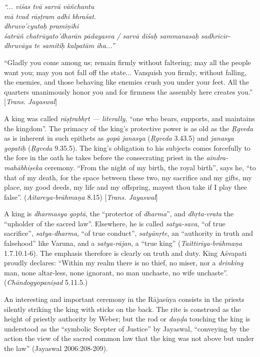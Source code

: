 \begin{myquote}
{{\sl “... viśas tvā sarvā vāñchantu}}\\
{{\sl mā tvad rāṣṭram adhi bhraśat.}}\\
{{\sl dhruvo’cyutaḥ pramiṇīhi}}\\
{{\sl śatrūñ chatrūyato’dharān pādayasva /}}
{{\sl sarvā diśaḥ sammanasaḥ}}
{{\sl sadhrīcīr-dhruvāya te samitiḥ kalpatām iha...”}}
\end{myquote}

“Gladly you come among us; remain firmly without faltering; may all the people want you; may you not fall off the state... Vanquish you firmly, without falling, the enemies, and those behaving like enemies crush you under your feet. All the quarters unanimously honor you and for firmness the assembly here creates you.” [{\sl Trans. Jayaswal}]

A king was called {\sl rāṣṭrabhṛt --- literally}, “one who bears, supports, and maintains the kingdom”.  The primacy of the king’s protective power is as old as the {\sl Ṛgveda} as is inherent in such epithets as {\sl gopā janasya} ({\sl Ṛgveda} 3.43.5) and {\sl janasya gopatiḥ} ({\sl Ṛgveda} 9.35.5). The king’s obligation to his subjects comes forcefully to the fore in the oath he takes before the consecrating priest in the {\sl aindra-mahābhiṣeka} ceremony. “From the night of my birth, the royal birth”, says he, “to that of my death, for the space between these two, my sacrifice and my gifts, my place, my good deeds, my life and my offspring, mayest thou take if I play thee false”. ({\sl Aitareya-brāhmaṇa} 8.15) [{\sl Trans. Jayaswal}]

A king is {\sl dharmasya goptā}, the “protector of {\sl dharma}”, and {\sl dhṛta-vrata} the “upholder of the sacred law”. Elsewhere, he is called {\sl satya-sava}, “of true sacrifice”, {\sl satya-dharma}, “of true conduct”, {\sl satyānṛte}, an “authority in truth and falsehood” like Varuna, and a {\sl satya-rājan}, a “true king” ({\sl Taittirīya-brāhmaṇa} 1.7.10.1-6). The emphasis therefore is clearly on truth and duty. King Aśvapati proudly declares: “Within my realm there is no thief, no miser, nor a {\sl drinking} man, none altar-less, none ignorant, no man unchaste, no wife unchaste”. ({\sl Chāndogyopaniṣad} 5.11.5.) 

An interesting and important ceremony in the Rājasūya consists in the priests silently striking the king with sticks on the back. The rite is construed as the height of priestly authority by Weber; but the rod or {\sl daṇḍa} touching the king is understood as the “symbolic Scepter of Justice” by Jayaswal, “conveying by the action the view of the sacred common law that the king was not above but under the law” (Jayaswal 2006:208-209). 

